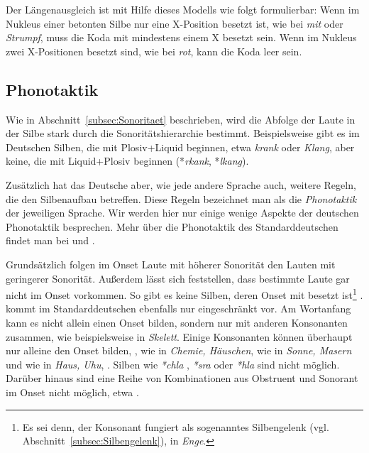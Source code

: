 Der Längenausgleich ist mit Hilfe dieses Modells wie folgt formulierbar: Wenn im Nukleus einer betonten Silbe nur eine X-Position besetzt ist, wie \zB bei \textit{mit} oder \textit{Strumpf}, muss die Koda mit mindestens einem X besetzt sein. Wenn im Nukleus zwei X-Positionen besetzt sind, wie bei \textit{rot}, kann die Koda leer sein.


\subsection{Phonotaktik}\label{subsec:Phonotaktik}

Wie in Abschnitt~\ref{subsec:Sonoritaet} beschrieben, wird die Abfolge der Laute in der Silbe stark durch die Sonoritätshierarchie bestimmt. Beispielsweise gibt es im Deutschen Silben, die mit Plosiv+Liquid beginnen, etwa \textit{krank} oder \textit{Klang}, aber keine, die mit Liquid+Plosiv beginnen (*\textit{rkank}, *\textit{lkang}). 

Zusätzlich hat das Deutsche aber, wie jede andere Sprache auch, weitere Regeln, die den Silbenaufbau betreffen. Diese Regeln bezeichnet man als die \textit{Phonotaktik} der jeweiligen Sprache. Wir werden hier nur einige wenige Aspekte der deutschen Phonotaktik besprechen. Mehr über die Phonotaktik des Standarddeutschen findet man bei \citet{Hall1992} und \citet{Noske1993}.

Grundsätzlich folgen im Onset Laute mit höherer Sonorität den Lauten mit geringerer Sonorität. Außerdem lässt sich feststellen, dass bestimmte Laute gar nicht im Onset vorkommen. So gibt es keine Silben, deren Onset mit  besetzt ist\footnote{Es sei denn, der Konsonant fungiert als sogenanntes Silbengelenk (vgl. Abschnitt~\ref{subsec:Silbengelenk}), \zB in \textit{Enge}.} \citep[230]{Hall2000}.  kommt im Standarddeutschen ebenfalls nur eingeschränkt vor. Am Wortanfang kann es nicht allein einen Onset bilden, sondern nur mit anderen Konsonanten zusammen, wie beispielsweise  in \textit{Skelett}. Einige Konsonanten können überhaupt nur alleine den Onset bilden, \zB {}, wie in \textit{Chemie, Häuschen},  wie in \textit{Sonne, Masern} und  wie in \textit{Haus, Uhu}, \citep[232]{Hall2000}. Silben wie \textit{*chla} , \textit{*sra}  oder \textit{*hla}  sind nicht möglich. Darüber hinaus sind eine Reihe von Kombinationen aus Obstruent und Sonorant im Onset nicht möglich, etwa  \citep[231]{Hall2000}.

